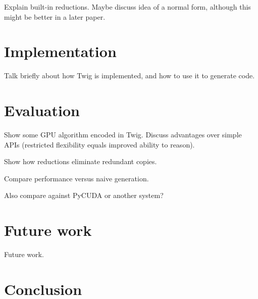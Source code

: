 \documentclass[11pt]{article}
\begin{document}
Explain built-in reductions. Maybe discuss idea of a normal form, although
this might be better in a later paper.

\section{Implementation}

Talk briefly about how Twig is implemented, and how to use it to generate
code.

\section{Evaluation}

Show some GPU algorithm encoded in Twig. Discuss advantages over simple APIs
(restricted flexibility equals improved ability to reason).

Show how reductions eliminate redundant copies.

Compare performance versus naive generation.

Also compare against PyCUDA or another system?

\section{Future work}

Future work.

\section{Conclusion}


% 

% 
% 
\end{document}
